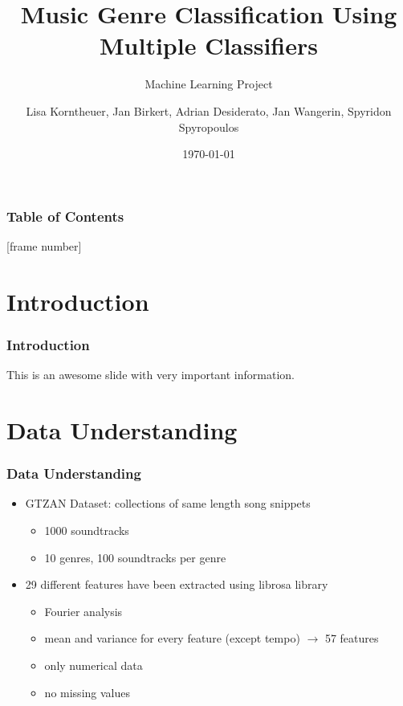 \documentclass[10pt, aspectratio=169]{beamer}
\title{Music Genre Classification Using Multiple Classifiers}
\subtitle{Machine Learning Project}
\author{Lisa Korntheuer, Jan Birkert, Adrian Desiderato, Jan Wangerin, Spyridon Spyropoulos}
\institute{Technische Hochschule Ulm}
\date{\today}
\begin{document}
\newcommand{\subtext}[1]{$_{\text{#1}}$}

\begin{frame}
    \maketitle
\end{frame}
\begin{frame}[noframenumbering]
    \frametitle{Table of Contents}
    \tableofcontents
\end{frame}
\AtBeginSection[]{
        }
        [frame number]
\section{Introduction}
\begin{frame}
    \frametitle{Introduction}
    \begin{outline}
        \1 This is an awesome slide with very important information. 
    \end{outline}
\end{frame}

\section{Data Understanding}
\begin{frame}
    \frametitle{Data Understanding}
    \begin{itemize}\setlength\itemsep{10pt}
        \item GTZAN Dataset: collections of same length song snippets\begin{itemize}
            \item 1000 soundtracks
            \item 10 genres, 100 soundtracks per genre
        \end{itemize}
        \item 29 different features have been extracted using librosa library\begin{itemize}
            \item Fourier analysis
            \item mean and variance for every feature (except tempo) $\rightarrow$ 57 features
            \item only numerical data
            \item no missing values
        \end{itemize}
    \end{itemize}
\end{frame}
\end{document}
